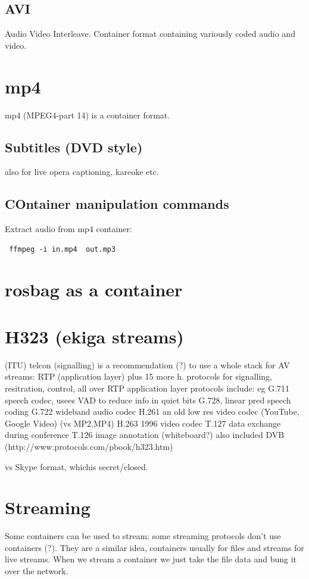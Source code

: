 \documentclass[oneside,english]{scrbook}
\begin{document}
\section{AVI}
Audio Video Interleave. Container format containing variously coded audio and video.

\chapter{mp4}
mp4 (MPEG4-part 14) is a container format.

\section{Subtitles (DVD style)}
also for live opera captioning, kareoke etc.

\section{COntainer manipulation commands}

Extract audio from mp4 container:
\begin{lstlisting}
 ffmpeg -i in.mp4  out.mp3
\end{lstlisting}


\chapter{rosbag as a container}

\chapter{H323 (ekiga streams)}
 (ITU) telcon  (signalling)
	is a recommendation (?) to use a whole stack for AV streams:
		RTP (application layer)		
		plus 15 more h. protocols for signalling, resitration, control, all over RTP
		application layer protocols include:
			eg G.711 speech codec, usees VAD to reduce info in quiet bits
			    G.728, linear pred speech coding
			G.722 wideband audio codec
			H.261 an old low res video codec (YouTube, Google Video) (vs MP2,MP4)
			H.263 1996 video codec
			T.127 data exchange during conference
			T.126 image annotation (whiteboard?)
		also included DVB
		(http://www.protocols.com/pbook/h323.htm)

vs Skype format, whichis secret/closed.


\chapter{Streaming}
Some containers can be used to stream; some streaming protocols don't use containers (?). They are a similar idea, containers usually for files and streams for live streams. When we stream a container we just take the file data and bung it over the network.
\end{document}
